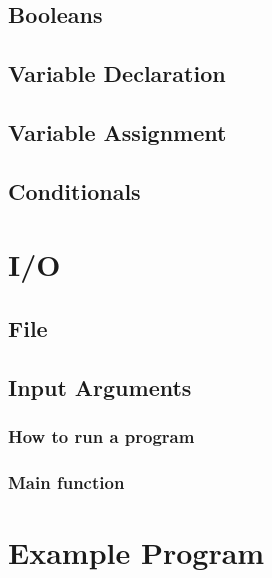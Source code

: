 \documentclass[titlepage]{article}
\begin{document}
\subsection{Booleans}
\subsection{Variable Declaration}
\subsection{Variable Assignment}
\subsection{Conditionals}

\section{I/O} \label{IO}
\subsection{File}
\subsection{Input Arguments}
\subsubsection{How to run a program}
\subsubsection{Main function}
\section{Example Program}
\end{document}
